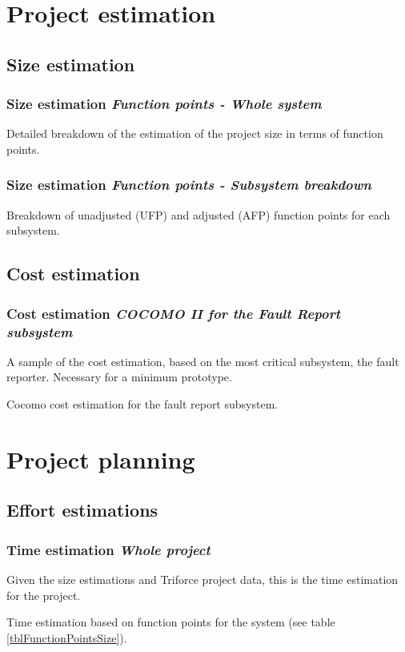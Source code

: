 \documentclass[10pt, compress,usetitleprogressbar,aspectratio=1610]{beamer}
\begin{document}
\section{Project estimation}

\subsection{Size estimation}
\begin{frame}
\frametitle{Size estimation \hfill \emph{Function points - Whole system}}
\begin{table}[hbtp]
\centering

\caption{Detailed breakdown of the estimation of the project size in terms of function points.}
\label{tblFunctionPointsSize}
\end{table}
\end{frame}

\begin{frame}
\frametitle{Size estimation \hfill \emph{Function points - Subsystem breakdown}}
\begin{table}[hbtp]
\centering

\caption{Breakdown of unadjusted (UFP) and adjusted (AFP) function points for each subsystem.}
\end{table}
\end{frame}

\subsection{Cost estimation}
\begin{frame}
\frametitle{Cost estimation \hfill \emph{COCOMO II for the Fault Report subsystem}}
A sample of the cost estimation, based on the most critical subsystem, the fault reporter. Necessary for a minimum prototype.

\begin{table}[hbtp]
\centering

\caption{Cocomo cost estimation for the fault report subsystem.}
\label{tblFaultReportCost}
\end{table}
\end{frame}

\section{Project planning}

\subsection{Effort estimations}
\begin{frame}
\frametitle{Time estimation \hfill \emph{Whole project}}
Given the size estimations and Triforce project data, this is the time estimation for the project.

\begin{table}[hbtp]
\centering

\caption{Time estimation based on function points for the system (see table \ref{tblFunctionPointsSize}).}
\label{tblFunctionPointsTime}
\end{table}
\end{frame}
\end{document}
